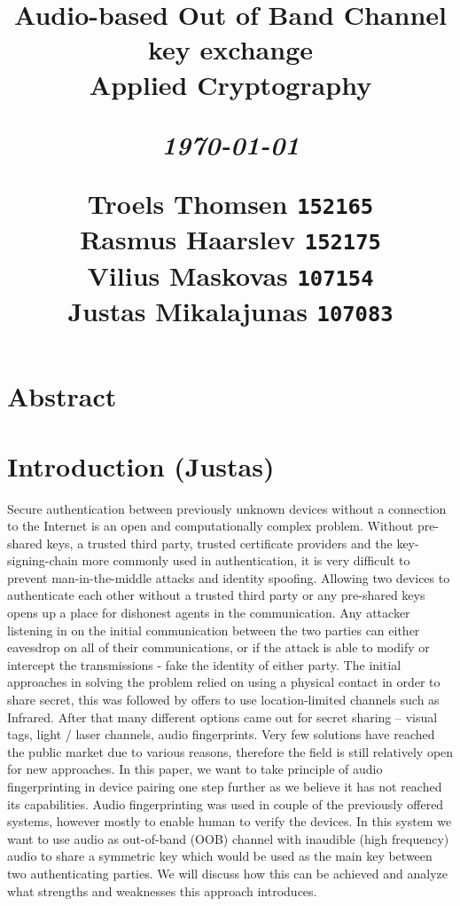 \documentclass[12pt]{article}
\title{
  \vspace{4cm}
  \begin{flushleft}
  \Large{\textbf{Audio-based Out of Band Channel key exchange}} \\
  \large{Applied Cryptography}
  \end{flushleft}
  \vspace{0cm}
  \begin{flushleft}
  \small
  \textit{\today}
  \end{flushleft}
  \vspace{12cm}
  \begin{flushleft}
  \small
  Troels Thomsen \texttt{152165} \\
  Rasmus Haarslev \texttt{152175} \\
  Vilius Maskovas \texttt{107154} \\
  Justas Mikalajunas \texttt{107083}\\
  \end{flushleft}
}
\date{
}
\begin{document}
\clearpage
{}
\thispagestyle{empty}
\maketitle

\newpage

\tableofcontents

\newpage


\section{Abstract}
\label{sec:Abstract}

\newpage

\section{Introduction (Justas)}
\label{sec:Introduction}
Secure authentication between previously unknown devices without a connection to the Internet is an open and computationally complex problem. Without pre-shared keys, a trusted third party, trusted certificate providers and the key-signing-chain more commonly used in authentication, it is very difficult to prevent man-in-the-middle attacks and identity spoofing.
\newline
Allowing two devices to authenticate each other without a trusted third party or any pre-shared keys opens up a place for dishonest agents in the communication. Any attacker listening in on the initial communication between the two parties can either eavesdrop on all of their communications, or if the attack is able to modify or intercept the transmissions - fake the identity of either party.
\newline
The initial approaches in solving the problem relied on using a physical contact in order to share secret, this was followed by offers to use location-limited channels such as Infrared. After that many different options came out for secret sharing – visual tags, light / laser channels, audio fingerprints. Very few solutions have reached the public market due to various reasons, therefore the field is still relatively open for new approaches.
\newline
In this paper, we want to take principle of audio fingerprinting in device pairing one step further as we believe it has not reached its capabilities. Audio fingerprinting was used in couple of the previously offered systems, however mostly to enable human to verify the devices. In this system we want to use audio as out-of-band (OOB) channel with inaudible (high frequency) audio to share a symmetric key which would be used as the main key between two authenticating parties. We will discuss how this can be achieved and analyze what strengths and weaknesses this approach introduces.
\end{document}
